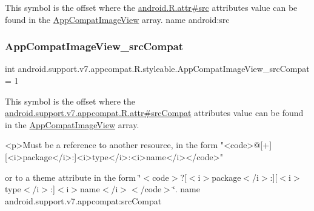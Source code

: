 This symbol is the offset where the \hyperlink{}{android.\+R.\+attr\#src} attribute\textquotesingle{}s value can be found in the \hyperlink{classandroid_1_1support_1_1v7_1_1appcompat_1_1R_1_1styleable_a8d637497c66d3f24c82211c9ec73a3d9}{App\+Compat\+Image\+View} array.  name android\+:src \mbox{\label{classandroid_1_1support_1_1v7_1_1appcompat_1_1R_1_1styleable_af3c899a6b3300b34fe73e036212d9a16}} 
\subsubsection{\texorpdfstring{App\+Compat\+Image\+View\+\_\+src\+Compat}{AppCompatImageView\_srcCompat}}
{\footnotesize\ttfamily int android.\+support.\+v7.\+appcompat.\+R.\+styleable.\+App\+Compat\+Image\+View\+\_\+src\+Compat = 1\hspace{0.3cm}{\ttfamily [static]}}

This symbol is the offset where the \hyperlink{classandroid_1_1support_1_1v7_1_1appcompat_1_1R_1_1attr_a105b975d386211520bb1ee265d48b7b8}{android.\+support.\+v7.\+appcompat.\+R.\+attr\#src\+Compat} attribute\textquotesingle{}s value can be found in the \hyperlink{classandroid_1_1support_1_1v7_1_1appcompat_1_1R_1_1styleable_a8d637497c66d3f24c82211c9ec73a3d9}{App\+Compat\+Image\+View} array.

\begin{DoxyVerb}      <p>Must be a reference to another resource, in the form "<code>@[+][<i>package</i>:]<i>type</i>:<i>name</i></code>"
\end{DoxyVerb}
 or to a theme attribute in the form \char`\"{}$<$code$>$?\mbox{[}$<$i$>$package$<$/i$>$\+:\mbox{]}\mbox{[}$<$i$>$type$<$/i$>$\+:\mbox{]}$<$i$>$name$<$/i$>$$<$/code$>$\char`\"{}.  name android.\+support.\+v7.\+appcompat\+:src\+Compat \mbox{\label{classandroid_1_1support_1_1v7_1_1appcompat_1_1R_1_1styleable_a87384e67b6e421e7c07536d9afe8d185}} 
